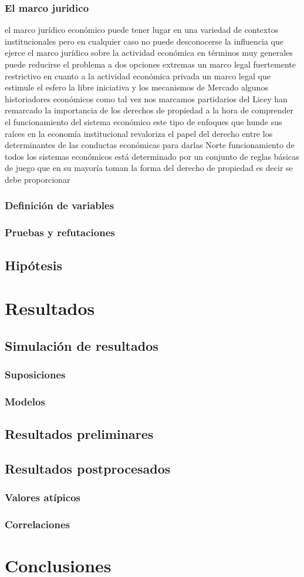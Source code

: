 \documentclass[12pt]{book}++
\begin{document}
\subsection{El marco juridico}
el marco jurídico económico puede tener lugar en una variedad de contextos institucionales pero en cualquier caso no puede desconocerse la influencia que ejerce el marco jurídico sobre la actividad económica en términos muy generales puede reducirse el problema a dos opciones extremas un marco legal fuertemente restrictivo en cuanto a la actividad económica privada un marco legal que estimule el esfero la libre iniciativa y los mecanismos de Mercado algunos historiadores económicos como tal vez nos marcamos partidarios del Licey han remarcado la importancia de los derechos de propiedad a la hora de comprender el funcionamiento del sistema económico este tipo de enfoques que hunde sus raíces en la economía institucional revaloriza el papel del derecho entre los determinantes de las conductas económicas para darlas Norte funcionamiento de todos los sistemas económicos está determinado por un conjunto de reglas básicas de juego que en su mayoría toman la forma del derecho de propiedad es decir se debe proporcionar
\subsection{Definición de variables}
\subsection{Pruebas y refutaciones}
\section{Hipótesis}
\chapter{Resultados}
\section{Simulación de resultados}
\subsection{Suposiciones}
\subsection{Modelos}
\section{Resultados preliminares}
\section{Resultados postprocesados}
\subsection{Valores atípicos}
\subsection{Correlaciones}
\chapter{Conclusiones}
\end{document}
